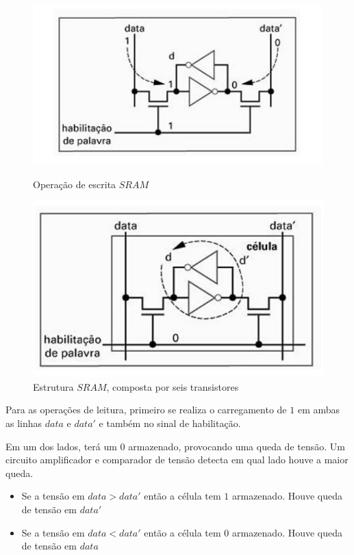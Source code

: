 \documentclass{article}
\begin{document}
\begin{figure}[h]
\centering
\begin{minipage}{0.48\textwidth}
    \centering
    \includegraphics[width=\linewidth]{escritaSRam.jpg}
    \caption{Operação de escrita $SRAM$}
    \label{fig:escritaSRam}
\end{minipage}\hfill
\begin{minipage}{0.48\textwidth}
    \centering
    \includegraphics[width=\linewidth]{estruturaSRam.jpg}
    \caption{Estrutura $SRAM$, composta por seis transistores}
    \label{fig:estruturaSRam}
\end{minipage}
\end{figure}

Para as operações de leitura, primeiro se realiza o carregamento de $1$ em ambas as linhas $data$ e $data'$ e também no sinal de habilitação.

Em um dos lados, terá um $0$ armazenado, provocando uma queda de tensão. Um circuito amplificador e comparador de tensão detecta em qual lado houve a maior queda. 

\begin{itemize}
     \item Se a tensão em $data > data'$ então a célula tem $1$ armazenado. Houve queda de tensão em $data'$
     \item Se a tensão em $data < data'$ então a célula tem $0$ armazenado. Houve queda de tensão em $data$
\end{itemize}
\end{document}
